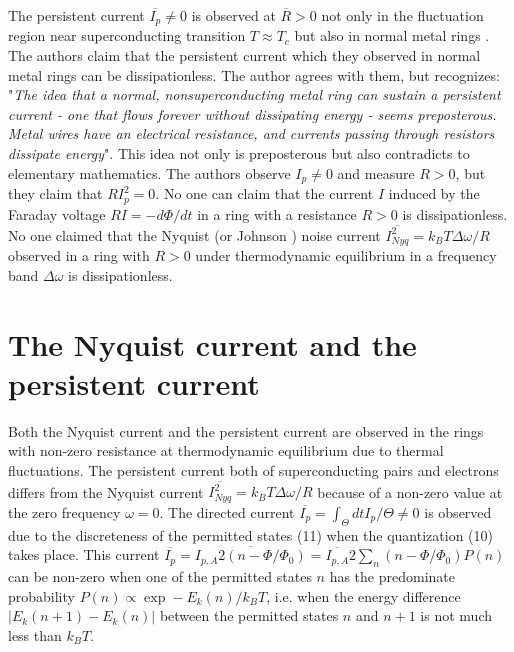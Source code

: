 \documentclass[twocolumn,secnumarabic,amssymb, nobibnotes, aps, prd]{revtex4}
\begin{document}
The persistent current $\overline{I_{p}} \neq 0$ is observed at $\overline{R} > 0$ not only in the fluctuation region near superconducting transition $T \approx T_{c}$ \cite{LP1962,Letter2007,PC2007} but also in normal metal rings \cite{Science2009PC,PRL2009PC}. The authors \cite{Science2009PC} claim that the persistent current which they observed in normal metal rings can be dissipationless. The author \cite{Birge2009} agrees with them, but recognizes: "{\it The idea that a normal, nonsuperconducting metal ring can sustain a persistent current - one that flows forever without dissipating energy - seems preposterous. Metal wires have an electrical resistance, and currents passing through resistors dissipate energy}". This idea not only is preposterous but also contradicts to elementary mathematics. The authors \cite{Science2009PC} observe $I_{p} \neq 0$ and measure $R > 0$, but they claim that $RI_{p}^{2} = 0$. No one can claim that the current $I$ induced by the Faraday voltage $RI = -d\Phi /dt$ in a ring with a resistance $R > 0$ is dissipationless. No one claimed that the Nyquist \cite{Nyquist} (or Johnson \cite{Johnson}) noise current $\overline{I_{Nyq}^{2}}  = k_{B}T\Delta \omega /R$ observed in a ring with $R > 0$ under thermodynamic equilibrium in a frequency band $\Delta \omega $ is dissipationless.

\section{The Nyquist current and the persistent current}
Both the Nyquist current and the persistent current are observed in the rings with non-zero resistance \cite{Letter2007,PC2007,Science2009PC,PRL2009PC} at thermodynamic equilibrium due to thermal fluctuations. The persistent current both of superconducting pairs \cite{Letter2007,PC2007} and electrons \cite{Science2009PC,PRL2009PC} differs from the Nyquist current $\overline{I_{Nyq}^{2}}  = k_{B}T\Delta \omega /R$ because of a non-zero value at the zero frequency $\omega = 0$. The directed current $\overline{I_{p}}  = \int_{\Theta} dt I_{p}/\Theta \neq 0$  is observed \cite{Letter2007,PC2007,Science2009PC,PRL2009PC} due to the discreteness of the permitted states (11) when the quantization (10) takes place. This current $\overline{I_{p}} = \overline{I_{p,A}2(n - \Phi /\Phi_{0})} = \overline{I_{p,A}}2\sum _{n}(n - \Phi /\Phi_{0})P(n)$ can be non-zero when one of the permitted states $n$ has the predominate probability $P(n) \propto \exp -E_{k}(n)/k_{B}T$, i.e. when the energy difference $|E_{k}(n+1) - E_{k}(n)|$ between the permitted states $n$ and $n+1$ is not much less than $k_{B}T$.  
\end{document}
